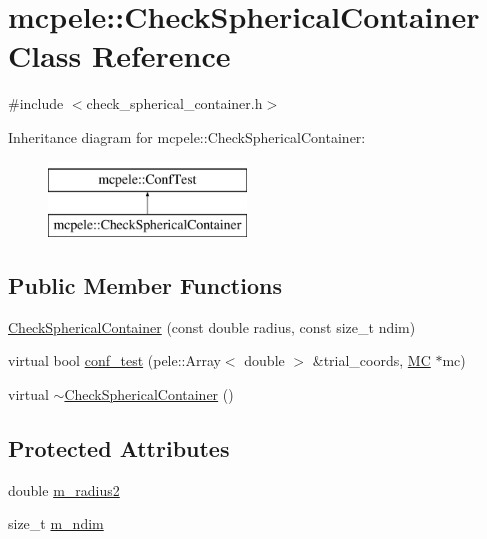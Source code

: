 \hypertarget{classmcpele_1_1CheckSphericalContainer}{\section{mcpele\-:\-:\-Check\-Spherical\-Container \-Class \-Reference}
\label{classmcpele_1_1CheckSphericalContainer}
}


{\ttfamily \#include $<$check\-\_\-spherical\-\_\-container.\-h$>$}

\-Inheritance diagram for mcpele\-:\-:\-Check\-Spherical\-Container\-:\begin{figure}[H]
\begin{center}
\leavevmode
\includegraphics[height=2.000000cm]{classmcpele_1_1CheckSphericalContainer}
\end{center}
\end{figure}
\subsection*{\-Public \-Member \-Functions}
\begin{DoxyCompactItemize}
\item 
\hyperlink{classmcpele_1_1CheckSphericalContainer_af1ddbdb3d2651a18df37447af8749853}{\-Check\-Spherical\-Container} (const double radius, const size\-\_\-t ndim)
\item 
virtual bool \hyperlink{classmcpele_1_1CheckSphericalContainer_a69f1b9e554a00d539477443dedbb3426}{conf\-\_\-test} (pele\-::\-Array$<$ double $>$ \&trial\-\_\-coords, \hyperlink{classmcpele_1_1MC}{\-M\-C} $\ast$mc)
\item 
virtual \hyperlink{classmcpele_1_1CheckSphericalContainer_ae0031a4990e7465c8f550f7bfe367042}{$\sim$\-Check\-Spherical\-Container} ()
\end{DoxyCompactItemize}
\subsection*{\-Protected \-Attributes}
\begin{DoxyCompactItemize}
\item 
double \hyperlink{classmcpele_1_1CheckSphericalContainer_a692b8da3daa2d45a7fc651d2ce045763}{m\-\_\-radius2}
\item 
size\-\_\-t \hyperlink{classmcpele_1_1CheckSphericalContainer_a4c900129e7fe133b1ddd3f9957eb1154}{m\-\_\-ndim}
\end{DoxyCompactItemize}


